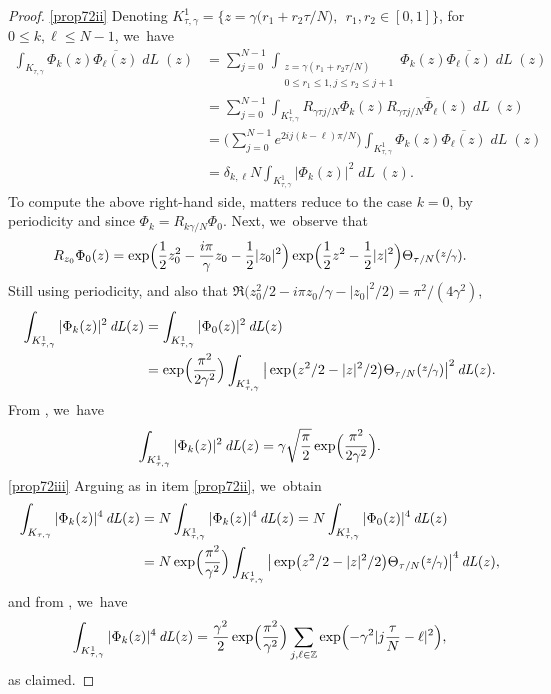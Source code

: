 \documentclass[JEP,XML,SOM,Unicode,NoFloatCountersInSection,published]{cedram}
\DeclareMathOperator{\dL}{\mathit{dL}}
\theoremstyle{definition}
\let\EE\exp
\let\ov\overline
\newcommand\Z{\mathbb Z}
\begin{document}
\begin{proof}
\eqref{prop72ii}
Denoting $K^1_{\tau,\gamma}=\bigl\{z=\gamma\bigl(r_{1}+r_{2}{\tau}/{N}\bigr),\;\, r_{1},r_{2}\in[0,1]\bigr\}$, for $0 \leq k, \ell \leq N-1$, we~have
\begin{align*}
\int_{K_{\tau,\gamma}}\Phi_{k}(z)\ov{\Phi_{\ell}(z)} \dL(z)&= \sum_{j=0}^{N-1}\int_{\substack{z=\gamma(r_{1}+r_{2}{\tau}/N)\\0\leq r_{1}\leq1,j\leq r_{2}\leq j+1}}\Phi_{k}(z)\ov{\Phi_{\ell}(z)} \dL(z) \\
& = \sum_{j=0}^{N-1}\int_{K^1_{\tau,\gamma}}R_{{\gamma \tau j}/{N}}\Phi_{k}(z)\ov{R_{{\gamma \tau j }/{N}}\Phi_{\ell}(z)} \dL(z) \\
&= \biggl(\sum_{j=0}^{N-1}e^{{2ij(k-\ell)\pi}/ N}\biggr)\int_{K^1_{\tau,\gamma}}\Phi_{k}(z)\ov{\Phi_{\ell}(z)}\dL(z)\\
& = \delta_{k,\ell}N\int_{K^1_{\tau,\gamma}}|\Phi_{k}(z)|^{2}\dL(z).
\end{align*}
To compute the above right-hand side, matters reduce to the case $k=0$, by periodicity and since $\Phi_{k}=R_{{k \gamma}/ N} \Phi_{0}$. Next, we~observe that
\[
R_{z_0} \Phi_0(z) = \EE \Bigl({\frac{1}{2} z_0^2- \frac{i\pi}{\gamma} z_0- \frac{1}{2} |z_0|^2} \Bigr)\EE\Bigl({\frac{1}{2} z^2 - \frac{1}{2} |z|^2}\Bigr) \Theta_{{\tau}/{N}}(\sfrac{z}{\gamma}).
\]
Still using periodicity, and also that $\Re \bigl(z_0^2/2 - {i\pi} z_0/ {\gamma} - |z_0|^2/2 \bigr) = {\pi^2}/({4 \gamma^2})$,
\begin{align*}
\int_{K^1_{\tau, \gamma}} |\Phi_{k}(z)|^2\dL(z) &= \int_{K^1_{\tau, \gamma}} |\Phi_{0}(z)|^2\dL(z) \\
& = \EE\Bigl(\frac{\pi^2}{2\gamma^2}\Bigr) \int_{K^1_{\tau, \gamma}} \big| \EE\bigl({ z^2/2 - |z|^2/2}\bigr) \Theta_{{\tau}/{N}}(\sfrac{z}{\gamma})\big|^2\dL(z).
\end{align*}
From \cite[last equality on p.\,681]{ABN}, we~have
\[
\int_{K^1_{\tau,\gamma}} |\Phi_{k}(z)|^2\dL(z) = \gamma \sqrt{\frac{\pi}{ {2}}} \EE\Bigl(\frac{\pi^2}{2\gamma^2}\Bigr).
\]
\eqref{prop72iii}
Arguing as in item \eqref{prop72ii}, we~obtain
\begin{align*}
\int_{K_{\tau, \gamma}} |\Phi_{k}(z)|^4\dL(z) &=N \int_{K^1_{\tau, \gamma}} |\Phi_{k}(z)|^4\dL(z) = N \int_{K^1_{\tau, \gamma}} |\Phi_{0}(z)|^4\dL(z) \\
& = N \EE\Bigl(\frac{\pi^2}{\gamma^2}\Bigr) \int_{K^1_{\tau,\gamma}} \big| \EE\bigl({ z^2/2 - |z|^2/2}\bigr) \Theta_{{\tau}/{N}}(\sfrac{z}{\gamma})\big|^4\dL(z),
\end{align*}
and from \cite[first equality on p.\,682]{ABN}, we~have
\[
\int_{K^1_{\tau,\gamma}} |\Phi_{k}(z)|^4\dL(z) = \frac{\gamma^2}2\EE\Bigl(\frac{\pi^2}{\gamma^2}\Bigr) \sum_{j, \ell\in \Z}\EE\Bigl({-\gamma^2 |j\frac{\tau}N-\ell|^{2}}\Bigr),
\]
as claimed.
\end{proof}
\end{document}
